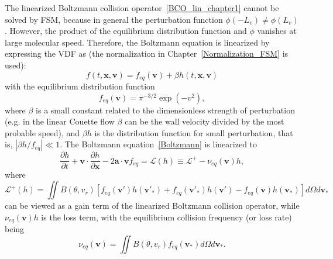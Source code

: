 The linearized Boltzmann collision operator~\eqref{BCO_lin_chapter1} cannot be solved by FSM, because in general the perturbation function $\phi(-L_v)\neq\phi(L_v)$. However, the product of the equilibrium distribution function and $\phi$ vanishes at large molecular speed. Therefore, the Boltzmann equation is linearized by expressing the VDF as (the normalization in Chapter~\ref{Normalization_FSM} is used):
\begin{equation}\label{Chapter_lin_VDF}
f(t,\bm{x},\bm{v})=f_{eq}(\bm{v})+\beta{}h(t,\bm{x},\bm{v})
\end{equation}
with the equilibrium distribution function
\begin{equation}\label{equilibrium_Maxwellian_lin}
f_{eq}(\bm{v})=\pi^{-3/2}\exp(-v^{2}),
\end{equation}
where $\beta$ is a small constant related to the dimensionless strength of perturbation (e.g. in the linear Couette flow $\beta$ can be the wall velocity divided by the most probable speed), and $\beta{}h$ is the distribution function for small perturbation, that is, $|\beta{}h/f_{eq}|\ll1$. The Boltzmann equation~\eqref{Boltzmann} is linearized to
\begin{equation}\label{Chapter1_Boltzmann_lin}
\frac{\partial {h}}{\partial t}+\bm{v}\cdot\frac{\partial{h}}{\partial
	\bm{x}}
-2\bm{a}\cdot\bm{v}f_{eq}=\mathcal{L}(h)\equiv{}\mathcal{L}^+-\nu_{eq}(\bm{v}){h},
\end{equation}
where 
\begin{equation}\label{linearized1}
\mathcal{L}^+(h)=\iint B(\theta,v_r)  [f_{eq}(\bm{v}')h({\bm{v}}'_{\ast})+f_{eq}(\bm{v}'_\ast)h({\bm{v}}')-f_{eq}(\bm{v})h({\bm{v}}_\ast)]d\Omega d{\bm{v}}_\ast
\end{equation}
can be viewed as a gain term of the linearized Boltzmann collision operator, while $\nu_{eq}(\bm{v}){h}$ is the loss term, with the equilibrium collision frequency (or loss rate) being
\begin{equation}\label{linearized2}
\nu_{eq}(\bm{v})=\iint{}B(\theta,{v}_r)f_{eq}(\bm{v}_{\ast}) d\Omega{d\bm{v}_\ast}.
\end{equation} 









